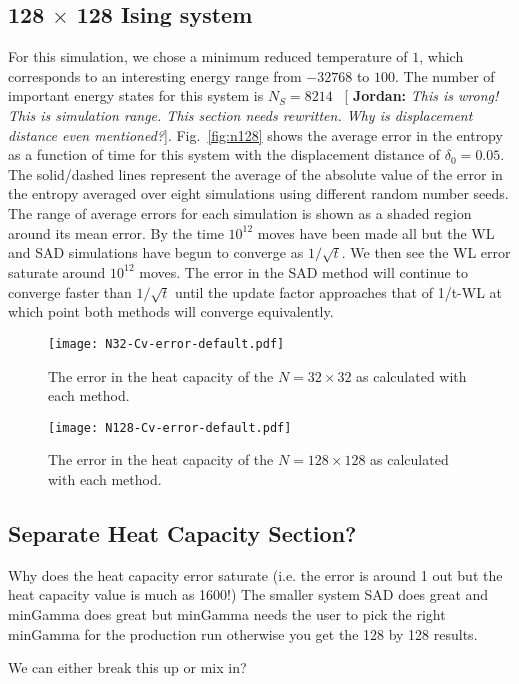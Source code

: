 \documentclass[letterpaper,twocolumn,amsmath,amssymb,pre,aps,10pt]{revtex4-1}
\newcommand{\blue}[1]{{\bf \color{blue} #1}}
\newcommand{\jpsays}[1]{{\color{red} [\blue{Jordan:} \emph{#1}]}}
\begin{document}
\subsection{128 $\times$ 128 Ising system}
For this simulation, we chose a minimum reduced temperature of $1$, which
corresponds to an interesting energy range from $-32768$ to $100$.  The number of
important energy states for this system is $N_S = 8214$~
\jpsays{This is wrong! This is simulation range. This section needs rewritten.  Why is displacement distance even mentioned?}.
Fig.~\ref{fig:n128} shows the average error in the entropy as a function of time
for this system with the displacement distance of $\delta_0 = 0.05$. The solid/dashed
lines represent the average of the absolute value of the error in the entropy
averaged over eight simulations using different random number seeds. The range
of average errors for each simulation is shown as a shaded region around its
mean error. By the time $10^{12}$ moves have been made all but the WL and SAD
simulations have begun to converge as $1/\sqrt{t}$. We then see the WL error
saturate around $10^{12}$ moves. The error in the SAD method will continue to
converge faster than $1/\sqrt{t}$ until the update factor approaches that of
1/t-WL at which point both methods will converge equivalently.

\begin{figure}
  \texttt{[image: N32-Cv-error-default.pdf]}
  \caption{The error in the heat capacity of the $N=32 \times 32$ as calculated with each method.}
  \label{fig:N32-cv-error}
\end{figure}

\begin{figure}
  \texttt{[image: N128-Cv-error-default.pdf]}
  \caption{The error in the heat capacity of the $N=128 \times 128$ as calculated with each method.}
  \label{fig:N128-cv-error}
\end{figure}

\subsection{Separate Heat Capacity Section?}
Why does the heat capacity error saturate (i.e. the error is around 1 out 
but the heat capacity value is much as 1600!)
The smaller system SAD does great and minGamma does great but minGamma needs
the user to pick the right minGamma for the production run otherwise you get
the 128 by 128 results.

We can either break this up or mix in?
\end{document}
